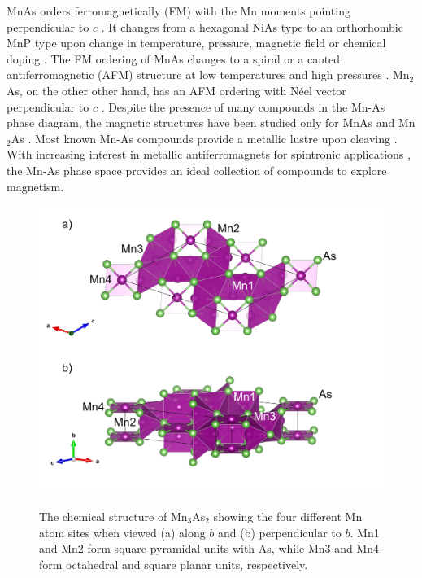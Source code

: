 \documentclass[10pt,doublespacing,edeposit]{uiucthesis2020}
\begin{document}
\begin{mainmatter}
MnAs orders ferromagnetically (FM) with the Mn moments pointing perpendicular to $c$ \cite{Bacon1955}. It changes from a hexagonal NiAs type to an orthorhombic MnP type upon change in temperature, pressure, magnetic field or chemical doping \cite{Glazkov2003,Ishikawa2006,Sirota1971,Pytlik1985,Schwartz1971}. 
The FM ordering of MnAs changes to a spiral or a canted antiferromagnetic (AFM) structure at low temperatures and high pressures \cite{Bacon1955,Andresen1984,Glazkov2003}. 
Mn$_2$As, on the other other hand, has an AFM ordering with N\'eel vector perpendicular to $c$ \cite{Austin1962}.
Despite the presence of many compounds in the Mn-As phase diagram, the magnetic structures have been studied only for MnAs and Mn$_2$As \cite{Bacon1955,Austin1962}.
Most known Mn-As compounds provide a metallic lustre upon cleaving \cite{Hagedorn1995,Hagedorn1994,Dietrich1990,Moller1993}.
With increasing interest in metallic antiferromagnets for spintronic applications \cite{Baltz2018,Siddiqui2020,Jungfleisch2018}, the Mn-As phase space provides an ideal collection of compounds to explore magnetism.

\begin{figure}
\centering\includegraphics[width=0.8\columnwidth]{figures/ch6/monoclinic_Mn3As2_75510.png} \\
\caption{The chemical structure of Mn$_3$As$_2$ showing the four different Mn atom sites when viewed (a) along $b$ and (b) perpendicular to $b$. Mn1 and Mn2 form square pyramidal units with As, while Mn3 and Mn4 form octahedral and square planar units, respectively.
}
\label{fig:Mn3As2_crystal_structure}
\end{figure}



\end{mainmatter}
\end{document}
